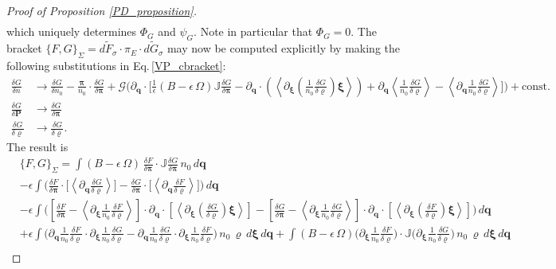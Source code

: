 \documentclass[%
 aip,
 amsmath,amssymb,
reprint, onecolumn %
]{revtex4-1}
\begin{document}
\begin{proof}[Proof of Proposition \ref{PD_proposition}]
\begin{align*}
\end{align*}
which uniquely determines $\Phi_G$ and $\psi_G$. Note in particular that $\Phi_G = 0$. The bracket $\{F,G\}_\Sigma = \widetilde{dF_\sigma}\cdot\pi_E\cdot\widetilde{dG_\sigma}$ may now be computed explicitly by making the following substitutions in Eq.\,\eqref{VP_cbracket}:
\begin{align*}
\frac{\delta G}{\delta n}&\rightarrow \frac{\delta G}{\delta n_0} -\frac{\bm{\pi}}{n_0}\cdot\frac{\delta G}{\delta\bm{\pi}} + \mathcal{G}\bigg(\partial_{\bm{q}}\cdot\bigg[\frac{1}{\epsilon}(B-\epsilon\,\Omega)\mathbb{J}\frac{\delta G}{\delta\bm{\pi}} - \partial_{\bm{q}}\cdot\left(\left\langle\partial_{\bm{\xi}}\left(\frac{1}{n_0}\frac{\delta G}{\delta\varrho}\right)\bm{\xi}\right\rangle\right) + \partial_{\bm{q}}\left\langle\frac{1}{n_0}\frac{\delta G}{\delta \varrho}\right\rangle - \left\langle\partial_{\bm{q}}\frac{1}{n_0}\frac{\delta G}{\delta\varrho}\right\rangle\bigg]\bigg)+\text{const.}\\
\frac{\delta G}{\delta\bm{P}}&\rightarrow \frac{\delta G}{\delta\bm{\pi}}\\
\frac{\delta G}{\delta\varrho} & \rightarrow\frac{\delta G}{\delta\varrho}.
\end{align*}
The result is
\begin{align}
&\{F,G\}_{\Sigma} = \int (B-\epsilon\,\Omega)\,\frac{\delta F}{\delta\bm{\pi}}\cdot \mathbb{J}\frac{\delta G}{\delta\bm{\pi}} \,n_0\,d\bm{q} \nonumber\\
%
&-\epsilon\int\bigg(\frac{\delta F}{\delta\bm{\pi}}\cdot \bigg[    \left\langle\partial_{\bm{q}}\frac{\delta G}{\delta\varrho}\right\rangle\bigg]-\frac{\delta G}{\delta\bm{\pi}}\cdot \bigg[  \left\langle\partial_{\bm{q}}\frac{\delta F}{\delta\varrho}\right\rangle\bigg]\bigg)\,d\bm{q}\nonumber\\
&- \epsilon \int \bigg(\left[\frac{\delta F}{\delta\bm{\pi}} - \left\langle\partial_{\bm{\xi}}\frac{1}{n_0}\frac{\delta F}{\delta\varrho}\right\rangle\right]\cdot\partial_{\bm{q}}\cdot\left[\left\langle\partial_{\bm{\xi}}\left(\frac{\delta G}{\delta\varrho}\right)\bm{\xi}\right\rangle\right] -\left[\frac{\delta G}{\delta\bm{\pi}} - \left\langle\partial_{\bm{\xi}}\frac{1}{n_0}\frac{\delta G}{\delta\varrho}\right\rangle\right]\cdot\partial_{\bm{q}}\cdot\left[\left\langle\partial_{\bm{\xi}}\left(\frac{\delta F}{\delta\varrho}\right)\bm{\xi}\right\rangle\right] \bigg)\,d\bm{q}\nonumber\\
&+\epsilon\int \bigg(\partial_{\bm{q}}\frac{1}{n_0}\frac{\delta F}{\delta \varrho}\cdot \partial_{\bm{\xi}}\frac{1}{n_0}\frac{\delta G}{\delta\varrho} -\partial_{\bm{q}}\frac{1}{n_0}\frac{\delta G}{\delta \varrho}\cdot \partial_{\bm{\xi}}\frac{1}{n_0}\frac{\delta F}{\delta\varrho} \bigg)\,n_0\,\varrho\,d\bm{\xi}\,d\bm{q} + \int (B-\epsilon\,\Omega)\bigg(\partial_{\bm{\xi}}\frac{1}{n_0}\frac{\delta F}{\delta\varrho}\bigg)\cdot\mathbb{J}\bigg(\partial_{\bm{\xi}}\frac{1}{n_0}\frac{\delta G}{\delta\varrho}\bigg)\,n_0\,\varrho\,d\bm{\xi}\,d\bm{q}\nonumber\\

\end{align}
\end{proof}
\end{document}
